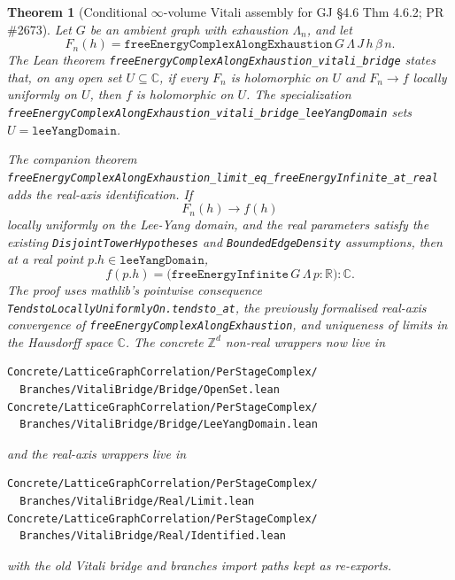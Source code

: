 \documentclass[a4paper,11pt]{article}
\newtheorem{theorem}{Theorem}
\begin{document}
\begin{theorem}[Conditional $\infty$-volume Vitali assembly for GJ \S 4.6 Thm 4.6.2; PR \#2673]
Let $G$ be an ambient graph with exhaustion $\Lambda_n$, and let
\[
  F_n(h)=\texttt{freeEnergyComplexAlongExhaustion}\,G\,\Lambda\,J\,h\,\beta\,n .
\]
The Lean theorem
\texttt{freeEnergyComplexAlongExhaustion\_vitali\_bridge} states that,
on any open set $U\subseteq\mathbb C$, if every $F_n$ is holomorphic on
$U$ and $F_n\to f$ locally uniformly on $U$, then $f$ is holomorphic on
$U$. The specialization
\texttt{freeEnergyComplexAlongExhaustion\_vitali\_bridge\_leeYangDomain}
sets $U=\texttt{leeYangDomain}$.

The companion theorem
\texttt{freeEnergyComplexAlongExhaustion\_limit\_eq\_freeEnergyInfinite\_at\_real}
adds the real-axis identification. If
\[
  F_n(h)\to f(h)
\]
locally uniformly on the Lee-Yang domain, and the real parameters satisfy
the existing \texttt{DisjointTowerHypotheses} and
\texttt{BoundedEdgeDensity} assumptions, then at a real point
$p.h\in\texttt{leeYangDomain}$,
\[
  f(p.h)=
  \bigl(\texttt{freeEnergyInfinite}\,G\,\Lambda\,p:\mathbb R\bigr):\mathbb C .
\]
The proof uses mathlib's pointwise consequence
\texttt{TendstoLocallyUniformlyOn.tendsto\_at}, the previously
formalised real-axis convergence of
\texttt{freeEnergyComplexAlongExhaustion}, and uniqueness of limits in
the Hausdorff space $\mathbb C$.
The concrete \(\mathbb Z^d\) non-real wrappers now live in
\begin{Verbatim}[fontsize=\footnotesize]
Concrete/LatticeGraphCorrelation/PerStageComplex/
  Branches/VitaliBridge/Bridge/OpenSet.lean
Concrete/LatticeGraphCorrelation/PerStageComplex/
  Branches/VitaliBridge/Bridge/LeeYangDomain.lean
\end{Verbatim}
and the real-axis wrappers live in
\begin{Verbatim}[fontsize=\footnotesize]
Concrete/LatticeGraphCorrelation/PerStageComplex/
  Branches/VitaliBridge/Real/Limit.lean
Concrete/LatticeGraphCorrelation/PerStageComplex/
  Branches/VitaliBridge/Real/Identified.lean
\end{Verbatim}
with the old Vitali bridge and branches import paths kept as re-exports.
\end{theorem}
\end{document}

